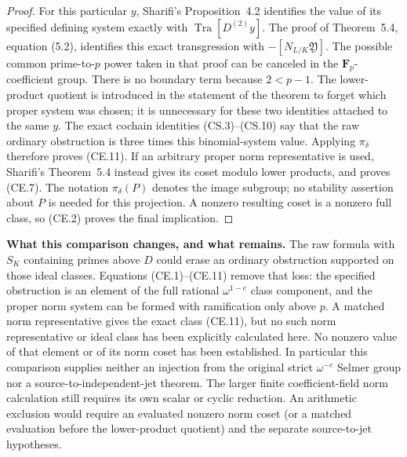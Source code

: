 \documentclass[11pt,a4paper]{article}
\theoremstyle{definition}
\renewcommand{\paragraph}[1]{\par\smallskip\noindent\textbf{#1}\quad\ignorespaces}
\begin{document}
\begin{proof}
For this particular \(y\), Sharifi's Proposition~4.2
identifies the value of its specified defining
system exactly with \(\operatorname{Tra}[D^{(2)}y]\).
The proof of Theorem~5.4, equation (5.2), identifies
this exact transgression with \(-[N_{L/K}\mathfrak Y]\).
The possible common prime-to-\(p\) power taken in
that proof can be canceled in the \(\mathbf F_p\)-coefficient
group.  There is no boundary term because
\(2<p-1\).  The lower-product quotient is introduced
in the statement of the theorem to forget which
proper system was chosen; it is unnecessary for
these two identities attached to the same \(y\).
The exact cochain identities (CS.3)--(CS.10) say
that the raw ordinary obstruction is three times
this binomial-system value.  Applying \(\pi_\delta\)
therefore proves (CE.11).  If an arbitrary proper
norm representative is used, Sharifi's Theorem~5.4
instead gives its coset modulo lower products,
and proves (CE.7).
The notation \(\pi_\delta(P)\) denotes the image subgroup;
no stability assertion about \(P\) is needed for this
projection.  A nonzero resulting coset is a nonzero full
class, so (CE.2) proves the final implication.
\end{proof}

\paragraph{What this comparison changes, and what remains.}
The raw formula with \(S_K\) containing primes above \(D\)
could erase an ordinary obstruction supported on those
ideal classes.  Equations (CE.1)--(CE.11) remove that loss:
the specified obstruction is an element of the full
rational \(\omega^{1-e}\) class component, and the
proper norm system can be formed with ramification only
above \(p\).  A matched norm representative gives
the exact class (CE.11), but no such norm representative
or ideal class has been explicitly calculated here.
No nonzero value of that element or of its norm coset
has been established.  In particular this
comparison supplies neither an injection from the
original strict \(\omega^{-e}\) Selmer group nor a
source-to-independent-jet theorem.  The larger finite
coefficient-field norm calculation still requires its
own scalar or cyclic reduction.  An arithmetic exclusion
would require an evaluated nonzero norm coset (or a
matched evaluation before the lower-product quotient)
and the separate source-to-jet hypotheses.
\end{document}
